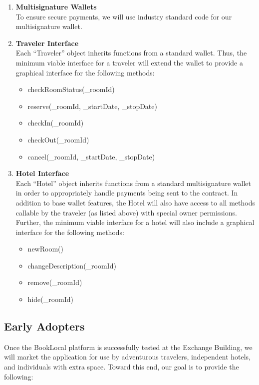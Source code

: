 \documentclass{article}
\begin{document}
\begin{enumerate}
\item{\textbf{Multisignature Wallets}} \\
To ensure secure payments, we will use industry standard code for our multisignature wallet.

\item{\textbf{Traveler Interface}} \\
Each ``Traveler'' object inherits functions from a standard wallet. Thus, the minimum viable interface for a traveler will extend the wallet to provide a graphical interface for the following methods: 
 \begin{itemize}
  \item checkRoomStatus(\_roomId)
  \item reserve(\_roomId, \_startDate, \_stopDate)
  \item checkIn(\_roomId)
  \item checkOut(\_roomId)
  \item cancel(\_roomId, \_startDate, \_stopDate)
 \end{itemize}
 
\item{\textbf{Hotel Interface}} \\
Each ``Hotel'' object inherits functions from a standard multisignature wallet in order to appropriately handle payments being sent to the contract. In addition to base wallet features, the Hotel will also have access to all methods callable by the traveler (as listed above) with special owner permissions. Further, the minimum viable interface for a hotel will also include a graphical interface for the following methods: 
 \begin{itemize}
  \item newRoom()
  \item changeDescription(\_roomId) 
  \item remove(\_roomId)
  \item hide(\_roomId)
 \end{itemize}
 
\end{enumerate}

\subsection{Early Adopters}
Once the BookLocal platform is successfully tested at the Exchange Building, we will market the application for use by adventurous travelers, independent hotels, and individuals with extra space. Toward this end, our goal is to provide the following:
\end{document}
